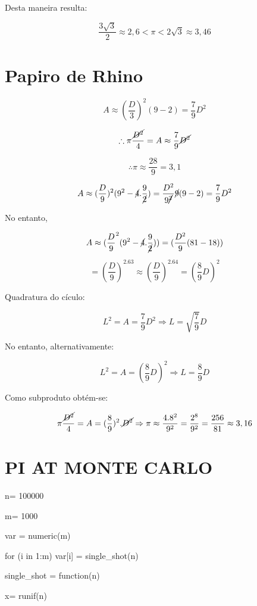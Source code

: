 \documentclass[a4paper, 12pt]{article}
\begin{document}
Desta maneira resulta:

\[\frac{3\sqrt{3}}{2} \approx 2,6 < \pi < 2\sqrt{3} \approx 3,46\]

\newpage

\section{Papiro de Rhino}

\[A \approx (\frac{D}{3})^2 (9-2) = \frac{7}{9}D^2\]

\[\therefore \pi \frac{\cancel{D^2}}{4} = A \approx \frac{7}{9} \cancel{D^2}\]

\[\therefore \pi \approx \frac{28}{9} = 3,1\]

\[A \approx (\frac{D}{9})^2(9^2 - \cancel{4}.\frac{9}{\cancel{2}}) = \frac{D^2}{9\cancel{^2}}\cancel{9}(9-2) = \frac{7}{9}D^2\]

No entanto, 

\[A \approx (\frac{D}{9}^2 (9^2-\cancel{4}.\frac{9}{\cancel{2}})) = (\frac{D^2}{9} (81-18))\]

\[= (\frac{D}{9})^2.63 \approx (\frac{D}{9})^2.64=(\frac{8}{9}D)^2\]

Quadratura do cículo:

\[L^2 = A = \frac{7}{9}D^2 \Rightarrow L = \sqrt{\frac{7}{9}}D\]

No entanto, alternativamente: 

\[L^2 = A = (\frac{8}{9}D)^2 \Rightarrow L=\frac{8}{9}D\]

Como subproduto obtém-se:

\[\pi \frac{\cancel{D^2}}{4} = A = (\frac{8}{9})^2.\cancel{D^2} \Rightarrow \pi \approx \frac{4.8^2}{9^2} = \frac{2^8}{9^2} = \frac{256}{81} \approx 3,16\]

\newpage

\section{PI AT MONTE CARLO}

n= 100000

m= 1000

var = numeric(m)

for (i in 1:m) var[i] = single\_shot(n)

single\_shot = function(n)

x= runif(n)
\end{document}
